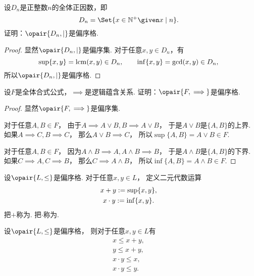 \begin{example}
设\(D_n\)是正整数\(n\)的全体正因数，即\[
	D_n = \Set{ x\in\mathbb{N}^+ \given x \mid n }.
\]
证明：\(\opair{D_n,\mid}\)是偏序格.
\begin{proof}
显然\(\opair{D_n,\mid}\)是偏序集.
对于任意\(x,y \in D_n\)，有\[
	\sup\{x,y\}
	= \operatorname{lcm}(x,y)
	\in D_n,
	\qquad
	\inf\{x,y\}
	= \operatorname{gcd}(x,y)
	\in D_n,
\]
所以\(\opair{D_n,\mid}\)是偏序格.
\end{proof}
\end{example}

\begin{example}
设\(F\)是全体合式公式，\(\implies\)是逻辑蕴含关系.
证明：\(\opair{F,\implies}\)是偏序格.
\begin{proof}
显然\(\opair{F,\implies}\)是偏序集.

对于任意\(A,B \in F\)，
由于\(A \implies A \lor B,
B \implies A \lor B\)，
于是\(A \lor B\)是\(\{A,B\}\)的上界.
如果\(A \implies C,
B \implies C\)，
那么\(A \lor B \implies C\)，
所以\(\sup\{A,B\}
= A \lor B
\in F\).

对于任意\(A,B \in F\)，
因为\(A \land B \implies A,
A \land B \implies B\)，
于是\(A \land B\)是\(\{A,B\}\)的下界.
如果\(C \implies A,
C \implies B\)，
那么\(C \implies A \land B\)，
所以\(\inf\{A,B\}
= A \land B
\in F\).
\end{proof}
\end{example}

\begin{definition}
设\(\opair{L,\leq}\)是偏序格.
对于任意\(x,y \in L\)，
定义二元代数运算\begin{gather*}
	x + y := \sup\{x,y\}, \\
	x \cdot y := \inf\{x,y\}.
\end{gather*}
把\(+\)称为.
把\(\cdot\)称为.
\end{definition}

\begin{theorem}
设\(\opair{L,\leq}\)是偏序格，
则对于任意\(x,y \in L\)有\begin{gather*}
	x \leq x + y, \\
	y \leq x + y, \\
	x \cdot y \leq x, \\
	x \cdot y \leq y.
\end{gather*}
\end{theorem}

